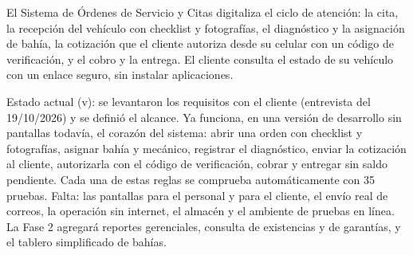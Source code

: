 El Sistema de Órdenes de Servicio y Citas digitaliza el ciclo de
atención: la cita, la recepción del vehículo con checklist y
fotografías, el diagnóstico y la asignación de bahía, la cotización que
el cliente autoriza desde su celular con un código de verificación, y el
cobro y la entrega. El cliente consulta el estado de su vehículo con un
enlace seguro, sin instalar aplicaciones.

Estado actual (v\versiondoc): se levantaron los requisitos con el
cliente (entrevista del 19/10/2026) y se definió el alcance. Ya funciona,
en una versión de desarrollo sin pantallas todavía, el corazón del
sistema: abrir una orden con checklist y fotografías, asignar bahía y
mecánico, registrar el diagnóstico, enviar la cotización al cliente,
autorizarla con el código de verificación, cobrar y entregar sin saldo
pendiente. Cada una de estas reglas se comprueba automáticamente con 35
pruebas. Falta: las pantallas para el personal y para el cliente, el envío
real de correos, la operación sin internet, el almacén y el ambiente de
pruebas en línea. La Fase 2 agregará reportes gerenciales, consulta de
existencias y de garantías, y el tablero simplificado de bahías.
